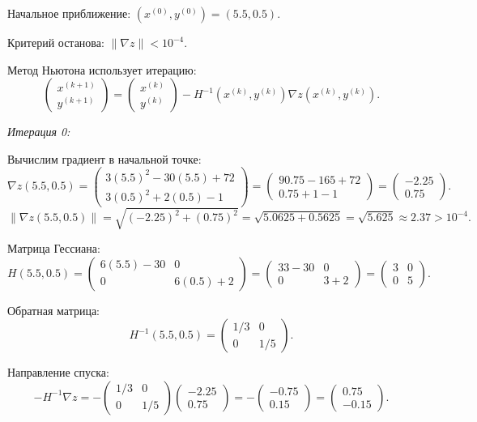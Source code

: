 \documentclass[12pt,a4paper]{article}
\begin{document}
Начальное приближение: $(x^{(0)}, y^{(0)}) = (5.5, 0.5)$.

Критерий останова: $\|\nabla z\| < 10^{-4}$.

Метод Ньютона использует итерацию:
\[
\begin{pmatrix} x^{(k+1)} \\ y^{(k+1)} \end{pmatrix}
= \begin{pmatrix} x^{(k)} \\ y^{(k)} \end{pmatrix}
- H^{-1}(x^{(k)}, y^{(k)}) \nabla z(x^{(k)}, y^{(k)}).
\]

\textit{Итерация 0:}

Вычислим градиент в начальной точке:
\[
\nabla z(5.5, 0.5) =
\begin{pmatrix}
3(5.5)^2 - 30(5.5) + 72 \\
3(0.5)^2 + 2(0.5) - 1
\end{pmatrix}
= \begin{pmatrix}
90.75 - 165 + 72 \\
0.75 + 1 - 1
\end{pmatrix}
= \begin{pmatrix}
-2.25 \\
0.75
\end{pmatrix}.
\]
\[
\|\nabla z(5.5, 0.5)\| = \sqrt{(-2.25)^2 + (0.75)^2} = \sqrt{5.0625 + 0.5625} = \sqrt{5.625} \approx 2.37 > 10^{-4}.
\]

Матрица Гессиана:
\[
H(5.5, 0.5) = \begin{pmatrix} 6(5.5) - 30 & 0 \\ 0 & 6(0.5) + 2 \end{pmatrix}
= \begin{pmatrix} 33 - 30 & 0 \\ 0 & 3 + 2 \end{pmatrix}
= \begin{pmatrix} 3 & 0 \\ 0 & 5 \end{pmatrix}.
\]

Обратная матрица:
\[
H^{-1}(5.5, 0.5) = \begin{pmatrix} 1/3 & 0 \\ 0 & 1/5 \end{pmatrix}.
\]

Направление спуска:
\[
-H^{-1} \nabla z = -\begin{pmatrix} 1/3 & 0 \\ 0 & 1/5 \end{pmatrix}
\begin{pmatrix} -2.25 \\ 0.75 \end{pmatrix}
= -\begin{pmatrix} -0.75 \\ 0.15 \end{pmatrix}
= \begin{pmatrix} 0.75 \\ -0.15 \end{pmatrix}.
\]
\end{document}
